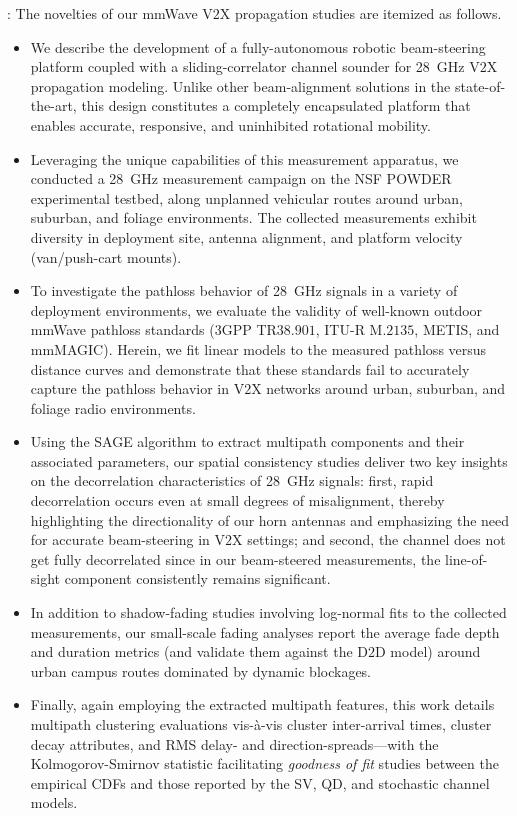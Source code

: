 \documentclass[12pt, draftcls, onecolumn]{IEEEtran}
\begin{document}
: The novelties of our mmWave V$2$X propagation studies are itemized as follows.
\begin{itemize}[leftmargin=*]
    \item We describe the development of a fully-autonomous robotic beam-steering platform coupled with a sliding-correlator channel sounder for \SI{28}{\giga\hertz} V$2$X propagation modeling. Unlike other beam-alignment solutions in the state-of-the-art, this design constitutes a completely encapsulated platform that enables accurate, responsive, and uninhibited rotational mobility.
    \item Leveraging the unique capabilities of this measurement apparatus, we conducted a \SI{28}{\giga\hertz} measurement campaign on the NSF POWDER experimental testbed, along unplanned vehicular routes around urban, suburban, and foliage environments. The collected measurements exhibit diversity in deployment site, antenna alignment, and platform velocity (van/push-cart mounts).
    \item To investigate the pathloss behavior of \SI{28}{\giga\hertz} signals in a variety of deployment environments, we evaluate the validity of well-known outdoor mmWave pathloss standards ($3$GPP TR$38.901$, ITU-R M$.2135$, METIS, and mmMAGIC). Herein, we fit linear models to the measured pathloss versus distance curves and demonstrate that these standards fail to accurately capture the pathloss behavior in V$2$X networks around urban, suburban, and foliage radio environments.
    \item Using the SAGE algorithm to extract multipath components and their associated parameters, our spatial consistency studies deliver two key insights on the decorrelation characteristics of \SI{28}{\giga\hertz} signals: first, rapid decorrelation occurs even at small degrees of misalignment, thereby highlighting the directionality of our horn antennas and emphasizing the need for accurate beam-steering in V$2$X settings; and second, the channel does not get fully decorrelated since in our beam-steered measurements, the line-of-sight component consistently remains significant.
    \item In addition to shadow-fading studies involving log-normal fits to the collected measurements, our small-scale fading analyses report the average fade depth and duration metrics (and validate them against the D$2$D model) around urban campus routes dominated by dynamic blockages.
    \item Finally, again employing the extracted multipath features, this work details multipath clustering evaluations vis-\`{a}-vis cluster inter-arrival times, cluster decay attributes, and RMS delay- and direction-spreads---with the Kolmogorov-Smirnov statistic facilitating \emph{goodness of fit} studies between the empirical CDFs and those reported by the SV, QD, and stochastic channel models.
\end{itemize}
\end{document}
